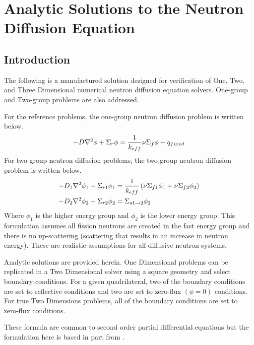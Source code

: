 \chapter{Analytic Solutions to the Neutron Diffusion Equation}
\label{ap:analyticSolutions}

\section{Introduction}
  The following is a manufactured solution designed for verification of One,
  Two, and Three Dimensional numerical neutron diffusion equation solvers.
  One-group and Two-group problems are also addressed.
  
  For the reference problems, the one-group neutron diffusion problem is written
  below.
  \begin{equation} \label{eq:onegroup}
    -D \mathbf{\nabla}^2 \phi + \Sigma_r \phi =  \frac{1}{k_{eff}} \nu \Sigma_f \phi + 
      q_{fixed}
  \end{equation}
  For two-group neutron diffusion problems, the two-group neutron diffusion 
  problem is written below.
  \begin{align} 
    \label{eq:twogroup1}
    -D_1 \mathbf{\nabla}^2 \phi_1 + \Sigma_{r1} \phi_1 &= \frac{1}{k_{eff}} \left(
      \nu \Sigma_{f1} \phi_1 + \nu \Sigma_{f2} \phi_2 \right) \\
    \label{eq:twogroup2}
    -D_2 \mathbf{\nabla}^2 \phi_2 + \Sigma_{r2} \phi_2 &= 
      \Sigma_{s 1 \rightarrow 2} \phi_2
  \end{align}
  Where $\phi_1$ is the higher energy group and $\phi_2$ is the lower energy 
  group. This formulation assumes all fission neutrons are created in the fast 
  energy group and there is no up-scattering (scattering that results in an 
  increase in neutron energy). These are realistic assumptions for all diffusive
  neutron systems.

  Analytic solutions are provided herein. One Dimensional problems can be 
  replicated in a Two Dimensional solver using a square geometry and select 
  boundary conditions. For a given quadrilateral, two of the boundary conditions
  are set to reflective conditions and two are set to zero-flux $(\phi = 0)$ 
  conditions. For true Two Dimensions problems, all of the boundary conditions 
  are set to zero-flux conditions.
  
  These formula are common to second order partial differential equations but
  the formulation here is based in part from \cite{textbooklewis}.

